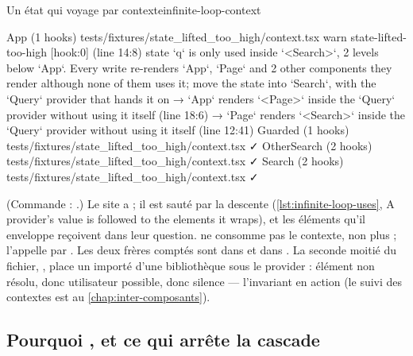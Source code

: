 \begin{exemple}{Un état qui voyage par contexte}{infinite-loop-context}
\begin{sortie}
  App  (1 hooks)  tests/fixtures/state_lifted_too_high/context.tsx
    warn   state-lifted-too-high  [hook:0]  (line 14:8)  state `q` is only used inside `<Search>`, 2 levels below `App`. Every write re-renders `App`, `Page` and 2 other components they render although none of them uses it; move the state into `Search`, with the `Query` provider that hands it on
       → `App` renders `<Page>` inside the `Query` provider without using it itself (line 18:6)
       → `Page` renders `<Search>` inside the `Query` provider without using it itself (line 12:41)
  Guarded  (1 hooks)  tests/fixtures/state_lifted_too_high/context.tsx  ✓
  OtherSearch  (2 hooks)  tests/fixtures/state_lifted_too_high/context.tsx  ✓
  Search  (2 hooks)  tests/fixtures/state_lifted_too_high/context.tsx  ✓
\end{sortie}
(Commande : .)
Le site  a  ; il est sauté par la descente (\cref{lst:infinite-loop-uses}, \og A provider's value is followed to the elements it wraps\fg), et les éléments qu'il enveloppe reçoivent  dans leur question.  ne consomme pas le contexte,  non plus ;  l'appelle par . Les deux frères comptés sont  dans  et  dans . La seconde moitié du fichier, , place un  importé d'une bibliothèque sous le provider : élément non résolu, donc utilisateur possible, donc silence --- l'invariant en action (le suivi des contextes est au \cref{chap:inter-composants}).
\end{exemple}

\subsection{Pourquoi \Warning, et ce qui arrête la cascade}

